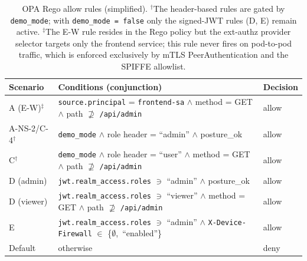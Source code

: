 \documentclass[conference]{IEEEtran}
\begin{document}
\begin{table}[!t]
\caption{OPA Rego allow rules (simplified). $^{\dagger}$The header-based rules are
gated by \texttt{demo\_mode}; with \texttt{demo\_mode = false} only the
signed-JWT rules (D, E) remain active. $^{\ddagger}$The E-W rule resides in the
Rego policy but the ext-authz provider selector targets only the frontend service;
this rule never fires on pod-to-pod traffic, which is enforced exclusively by
mTLS PeerAuthentication and the SPIFFE allowlist.}
\label{tab:rego}
\centering
\scriptsize
\begin{tabularx}{\columnwidth}{l >{\raggedright\arraybackslash}X l}
\toprule
Scenario & Conditions (conjunction) & Decision \\
\midrule
A (E-W)$^{\ddagger}$ & \texttt{source.principal} = \texttt{frontend-sa} $\wedge$ method = GET $\wedge$ path $\not\supseteq$ \texttt{/api/admin} & allow \\
A-NS-2/C-4$^{\dagger}$ & \texttt{demo\_mode} $\wedge$ role header = ``admin'' $\wedge$ posture\_ok & allow \\
C$^{\dagger}$ & \texttt{demo\_mode} $\wedge$ role header = ``user'' $\wedge$ method = GET $\wedge$ path $\not\supseteq$ \texttt{/api/admin} & allow \\
D (admin) & \texttt{jwt.realm\_access.roles} $\ni$ ``admin'' $\wedge$ posture\_ok & allow \\
D (viewer) & \texttt{jwt.realm\_access.roles} $\ni$ ``viewer'' $\wedge$ method = GET $\wedge$ path $\not\supseteq$ \texttt{/api/admin} & allow \\
E & \texttt{jwt.realm\_access.roles} $\ni$ ``admin'' $\wedge$ \texttt{X-Device-Firewall} $\in$ \{$\emptyset$,\ ``enabled''\} & allow \\
Default & otherwise & deny \\
\bottomrule
\end{tabularx}
\end{table}
\end{document}

